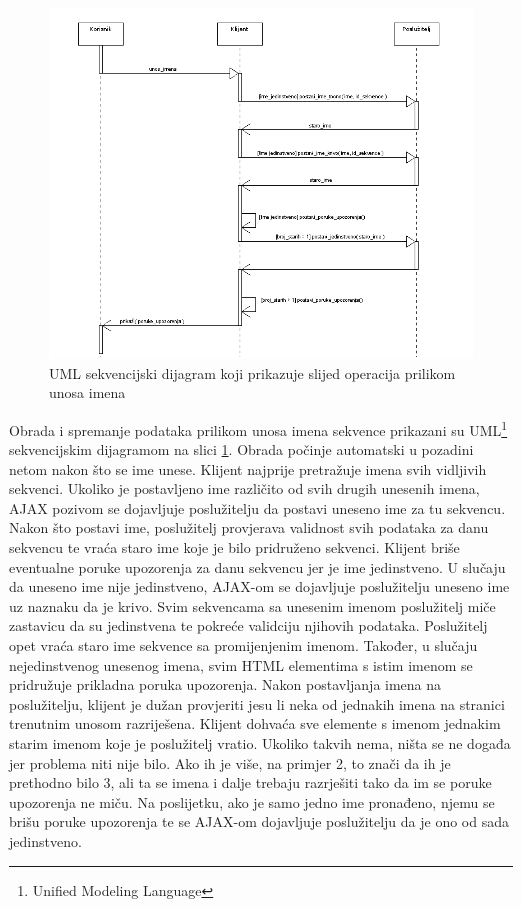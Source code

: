 \begin{figure}[h!]
\centering
\includegraphics[width=5.3in]{figures/Unos_imena.png}
\caption{UML sekvencijski dijagram koji prikazuje slijed operacija prilikom
unosa imena}
\label{fig:imena}
\end{figure}

Obrada i spremanje podataka prilikom unosa imena sekvence prikazani su
UML\footnote{Unified Modeling Language} sekvencijskim dijagramom na slici
\ref{fig:imena}. Obrada počinje automatski u pozadini netom nakon što se ime
unese. Klijent najprije pretražuje imena svih vidljivih sekvenci. Ukoliko je
postavljeno ime različito od svih drugih unesenih imena, AJAX pozivom se
dojavljuje poslužitelju da postavi uneseno ime za tu sekvencu. Nakon što postavi
ime, poslužitelj provjerava validnost svih podataka za danu sekvencu te vraća
staro ime koje je bilo pridruženo sekvenci. Klijent briše eventualne poruke
upozorenja za danu sekvencu jer je ime jedinstveno. U slučaju da uneseno ime
nije jedinstveno, AJAX-om se dojavljuje poslužitelju uneseno ime uz naznaku da
je krivo. Svim sekvencama sa unesenim imenom poslužitelj miče zastavicu da su
jedinstvena te pokreće validciju njihovih podataka. Poslužitelj opet vraća staro
ime sekvence sa promijenjenim imenom. Također, u slučaju nejedinstvenog unesenog
imena, svim HTML elementima s istim imenom se pridružuje prikladna poruka
upozorenja. Nakon postavljanja imena na poslužitelju, klijent je dužan
provjeriti jesu li neka od jednakih imena na stranici trenutnim unosom
razriješena. Klijent dohvaća sve elemente s imenom jednakim starim imenom koje
je poslužitelj vratio. Ukoliko takvih nema, ništa se ne događa jer problema niti
nije bilo. Ako ih je više, na primjer 2, to znači da ih je prethodno bilo 3, ali
ta se imena i dalje trebaju razrješiti tako da im se poruke upozorenja ne miču.
Na poslijetku, ako je samo jedno ime pronađeno, njemu se brišu poruke upozorenja
te se AJAX-om dojavljuje poslužitelju da je ono od sada jedinstveno.

